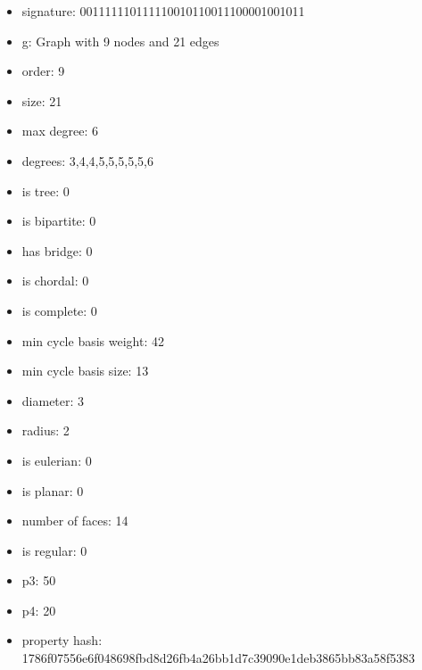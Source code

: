 \newpage
\begin{figure}
\end{figure}
\begin{itemize}
\item signature: 001111110111110010110011100001001011
\item g: Graph with 9 nodes and 21 edges
\item order: 9
\item size: 21
\item max degree: 6
\item degrees: 3,4,4,5,5,5,5,5,6
\item is tree: 0
\item is bipartite: 0
\item has bridge: 0
\item is chordal: 0
\item is complete: 0
\item min cycle basis weight: 42
\item min cycle basis size: 13
\item diameter: 3
\item radius: 2
\item is eulerian: 0
\item is planar: 0
\item number of faces: 14
\item is regular: 0
\item p3: 50
\item p4: 20
\item property hash: 1786f07556e6f048698fbd8d26fb4a26bb1d7c39090e1deb3865bb83a58f5383
\end{itemize}
